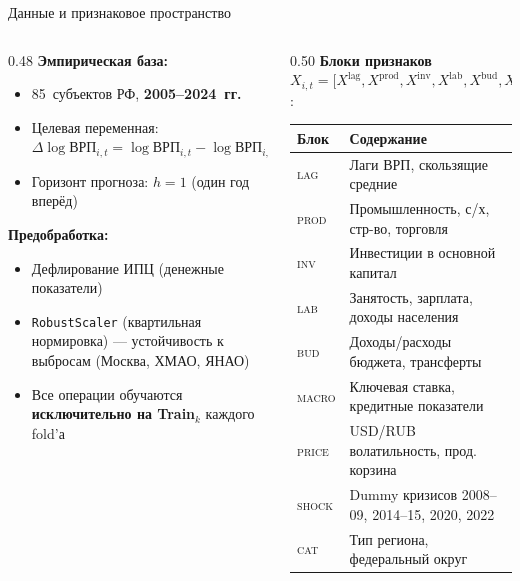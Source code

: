 \documentclass[aspectratio=169,12pt]{beamer}
\begin{document}
\begin{frame}{Данные и признаковое пространство}
\begin{columns}[T]
  \begin{column}{0.48\textwidth}
    \textbf{\color{hsedark}Эмпирическая база:}
    \begin{itemize}
      \item 85~субъектов РФ, \textbf{2005–2024~гг.}
      \item Целевая переменная:
            $\Delta\log\text{ВРП}_{i,t} = \log\text{ВРП}_{i,t} - \log\text{ВРП}_{i,t-1}$
      \item Горизонт прогноза: $h=1$ (один год вперёд)
    \end{itemize}
    \vspace{0.5em}
    \textbf{\color{hsedark}Предобработка:}
    \begin{itemize}
      \item Дефлирование ИПЦ (денежные показатели)
      \item \texttt{RobustScaler} (квартильная нормировка) — устойчивость к выбросам (Москва, ХМАО, ЯНАО)
      \item Все операции обучаются \textbf{исключительно на Train}$_k$ каждого fold'а
    \end{itemize}
  \end{column}
  \begin{column}{0.50\textwidth}
    \textbf{\color{hsedark}Блоки признаков}
    $X_{i,t} = \bigl[X^{\text{lag}}, X^{\text{prod}}, X^{\text{inv}},
     X^{\text{lab}}, X^{\text{bud}}, X^{\text{macro}}, X^{\text{price}},
     X^{\text{shock}}, X^{\text{cat}}\bigr]$:
    \vspace{0.3em}
    {\small
    \begin{tabular}{@{}ll@{}}
      \toprule
      Блок & Содержание \\
      \midrule
      \textsc{lag}  & Лаги ВРП, скользящие средние \\
      \textsc{prod} & Промышленность, с/х, стр-во, торговля \\
      \textsc{inv}  & Инвестиции в основной капитал \\
      \textsc{lab}  & Занятость, зарплата, доходы населения \\
      \textsc{bud}  & Доходы/расходы бюджета, трансферты \\
      \textsc{macro}& Ключевая ставка, кредитные показатели \\
      \textsc{price}& USD/RUB волатильность, прод. корзина \\
      \textsc{shock}& Dummy кризисов 2008–09, 2014–15, 2020, 2022 \\
      \textsc{cat}  & Тип региона, федеральный округ \\
      \bottomrule
    \end{tabular}}
  \end{column}
\end{columns}
\end{frame}
\end{document}
